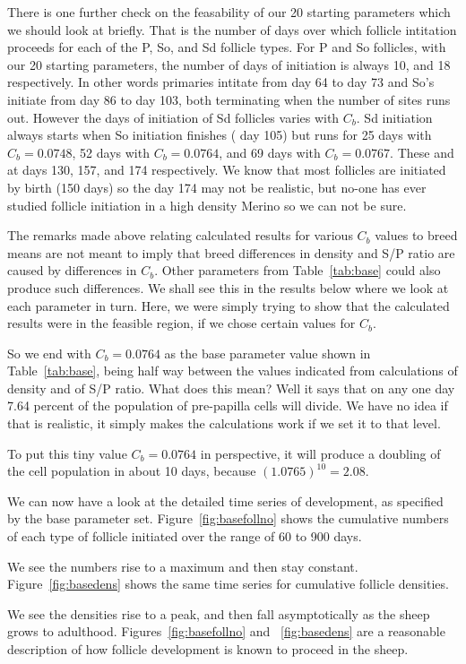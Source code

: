 \documentclass[titlepage]{article}  %
\begin{document}
There is one further check on the feasability of our 20 starting parameters which we should look at briefly. That is the number of days over which follicle intitation proceeds for each of the P, So, and Sd follicle types. For P and So follicles, with our 20 starting parameters, the number of days of initiation is always 10, and 18 respectively. In other words primaries intitate from day 64 to day 73 and So's initiate from day 86 to day 103, both terminating when the number of sites runs out. However the days of initiation of Sd follicles varies with $C_{b}$. Sd initiation always starts when So initiation finishes ( day 105) but runs for 25 days with $C_{b}=0.0748$, 52 days with $C_{b}=0.0764$, and 69 days with $C_{b}=0.0767$. These and at days 130, 157, and 174 respectively. We know that most follicles are initiated by birth (150 days) so the day 174 may not be realistic, but no-one has ever studied follicle initiation in a high density Merino so we can not be sure.

The remarks made above relating calculated results for various $C_{b}$ values to breed means are not meant to imply that breed differences  in density and S/P ratio are caused by differences in $C_{b}$. Other parameters from Table~\ref{tab:base} could also produce such differences. We shall see this in the results below where we look at each parameter in turn. Here, we were simply trying to show that the calculated results were in the feasible region, if we chose certain values for $C_{b}$.

So we end with $C_{b}=0.0764$ as the base parameter value shown in Table~\ref{tab:base}, being half way between the values indicated from calculations of density and of S/P ratio. What does this mean? Well it says that on any one day 7.64 percent of the population of pre-papilla cells will divide. We have no idea if that is realistic, it simply makes the calculations work if we set it to that level. 

To put this tiny value $C_{b}=0.0764$ in perspective, it will produce a doubling of the cell population in about 10 days, because $(1.0765)^{10} = 2.08$.

We can now have a look at the detailed time series of development, as specified by the base parameter set. Figure~\ref{fig:basefollno} shows the cumulative numbers of each type of follicle initiated over the range of 60 to 900 days.

We see the numbers rise to a maximum and then stay constant.
Figure~\ref{fig:basedens} shows the same time series for cumulative follicle densities. 

We see the densities rise to a peak, and then fall asymptotically as the sheep grows to adulthood.
Figures~\ref{fig:basefollno} and ~\ref{fig:basedens} are a reasonable description of how follicle development is known to proceed in the sheep.
\end{document}
